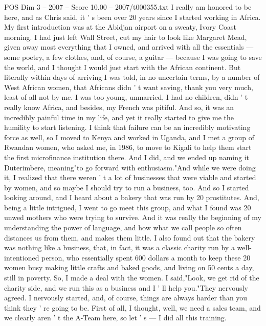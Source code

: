 \begin{textsample}{POS Dim 3 – 2007 – Score 10.00 – 2007/t000355.txt}  \label{ex:f3_pos_043}
I really am honored to be here, and as Chris said, it ' s been over 20 years since I started working in Africa.
My first introduction was at the Abidjan airport on a sweaty, Ivory Coast morning.
I had just left Wall Street, cut my hair to look like Margaret Mead, given away most everything that I owned, and arrived with all the essentials — some poetry, a few clothes, and, of course, a guitar — because I was going to save the world, and I thought I would just start with the African continent.
But literally within days of arriving I was told, in no uncertain terms, by a number of West African women, that Africans didn ' t want saving, thank you very much, least of all not by me.
I was too young, unmarried, I had no children, didn ' t really know Africa, and besides, my French was pitiful.
And so, it was an incredibly painful time in my life, and yet it really started to give me the humility to start listening.
I think that failure can be an incredibly motivating force as well, so I moved to Kenya and worked in Uganda, and I met a group of Rwandan women, who asked me, in 1986, to move to Kigali to help them start the first microfinance institution there.
And I did, and we ended up naming it Duterimbere, meaning"to go forward with enthusiasm."And while we were doing it, I realized that there weren ' t a lot of businesses that were viable and started by women, and so maybe I should try to run a business, too.
And so I started looking around, and I heard about a bakery that was run by 20 prostitutes.
And, being a little intrigued, I went to go meet this group, and what I found was 20 unwed mothers who were trying to survive.
And it was really the beginning of my understanding the power of language, and how what we call people so often distances us from them, and makes them little.
I also found out that the bakery was nothing like a business, that, in fact, it was a classic charity run by a well-intentioned person, who essentially spent 600 dollars a month to keep these 20 women busy making little crafts and baked goods, and living on 50 cents a day, still in poverty.
So, I made a deal with the women.
I said,"Look, we get rid of the charity side, and we run this as a business and I ' ll help you."They nervously agreed.
I nervously started, and, of course, things are always harder than you think they ' re going to be.
First of all, I thought, well, we need a sales team, and we clearly aren ' t the A-Team here, so let ' s — I did all this training.

\end{textsample}

